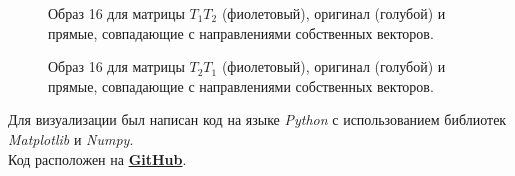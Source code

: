 \documentclass[a5paper, 10pt]{article}
\theoremstyle{definition}
\theoremstyle{plain}
\theoremstyle{remark}
\begin{document}
\newpage
\begin{figure}[h!]
\caption{Образ 16 для матрицы $T_1 T_2$ (фиолетовый), оригинал (голубой) и прямые, совпадающие с направлениями собственных векторов.}
\end{figure}

\newpage
\begin{figure}[h!]
\caption{Образ 16 для матрицы $T_2 T_1$ (фиолетовый), оригинал (голубой) и прямые, совпадающие с направлениями собственных векторов.}
\end{figure}

Для визуализации был написан код на языке \textit{Python} с использованием библиотек \textit{Matplotlib} и \textit{Numpy}. \\
Код расположен на \href{https://github.com/a-nechaeva/practical_Linal/tree/main/lab2/py_code}{\textbf{GitHub}}.
\end{document}
